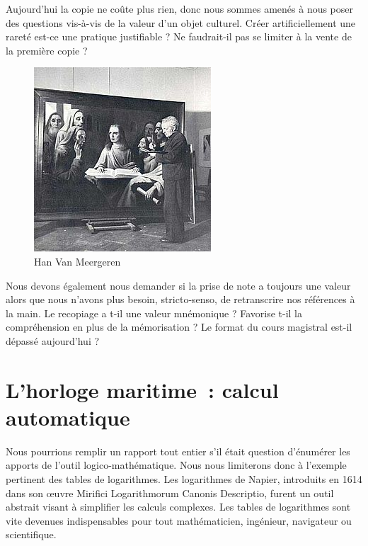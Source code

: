 \begin{minipage}[H]{0.44\linewidth}
Aujourd'hui la copie ne coûte plus rien, donc nous sommes amenés à nous poser des questions vis-à-vis de la valeur d'un objet culturel. Créer artificiellement une rareté est-ce une pratique justifiable ? Ne faudrait-il pas se limiter à la vente de la première copie ?
\vspace{1cm}
\end{minipage}
\begin{minipage}[H]{0.54\linewidth}
  \begin{figure}[H]
  \centering
  \includegraphics[height=0.15\paperheight]{../resources/illustrations/meergeren}
  \caption{Han Van Meergeren}
  \end{figure}
\end{minipage}

Nous devons également nous demander si la prise de note a toujours une valeur alors que nous n'avons plus besoin, stricto-senso, de retranscrire nos références à la main. Le recopiage a t-il une valeur mnémonique ? Favorise t-il la compréhension en plus de la mémorisation ? Le format du cours magistral est-il dépassé aujourd'hui ?

\chapter{L'horloge maritime~: calcul automatique}
Nous pourrions remplir un rapport tout entier s'il était question d'énumérer les apports de l'outil logico-mathématique. Nous nous limiterons donc à l'exemple pertinent des tables de logarithmes. Les logarithmes de Napier, introduits en 1614 dans son \oe{}uvre \og{}Mirifici Logarithmorum Canonis Descriptio\fg{}, furent un outil abstrait visant à simplifier les calculs complexes. Les tables de logarithmes sont vite devenues indispensables pour tout mathématicien, ingénieur, navigateur ou scientifique.

